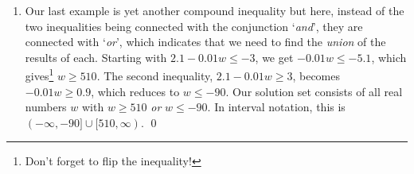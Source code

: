 \documentclass{ximera}
\begin{document}
\begin{example}
\begin{enumerate}
\[\begin{array}{rclr}
\end{array} \] We're only half done because we still have the rightmost inequality to solve.  Fortunately, that one seems rather mundane:  $4x+1 \leq 8$ reduces to $x \leq \frac{7}{4}$ without too much incident.  Our solution is $ x \geq \frac{4}{4-\sqrt{7}}$ \textit{and} $x \leq \frac{7}{4}$.  We may be tempted to write $\frac{4}{4-\sqrt{7}} \leq x \leq \frac{7}{4}$ and call it a day but that would be nonsense!  To see why, notice that $\sqrt{7}$ is between $2$ and $3$ so $\frac{4}{4 - \sqrt{7}}$ is between  $\frac{4}{4-2} = 2$ and $\frac{4}{4-3} = 4$. In particular, we get $\frac{4}{4 - \sqrt{7}} > 2$.  On the other hand, $\frac{7}{4} < 2$.  This means that our `solutions' have to be simultaneously  greater than $2$ AND less than $2$  which is impossible.  Therefore, this compound inequality has no solution, which means we did all that work for nothing.\footnote{Much like how people walking on treadmills get nowhere.  Math is the endurance cardio of the brain, folks!}

\item  Our last example is yet another compound inequality but here, instead of the two inequalities being connected with the conjunction `\textit{and}', they are connected with `\textit{or}', which indicates that we need to find the \textit{union} of the results of each.  Starting with $2.1 - 0.01w \leq -3$, we get $-0.01 w \leq -5.1$, which gives\footnote{Don't forget to flip the inequality!} $w \geq 510$.  The second inequality, $2.1-0.01w \geq 3$, becomes $-0.01w \geq 0.9$, which reduces to  $w \leq -90$.  Our solution set consists of all real numbers $w$ with $w \geq 510$ \textit{or} $w \leq -90$.  In interval notation, this is $(-\infty, -90] \cup [510, \infty)$. \qed

\end{enumerate}

\end{example}



\closegraphsfile
\end{document}
